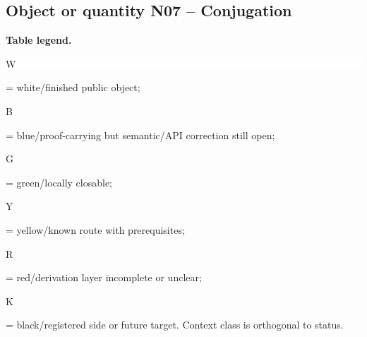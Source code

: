 \subsection*{Object or quantity N07 -- Conjugation}
\hypertarget{objproof:N07}{}
\par\smallskip\noindent\begin{minipage}{0.99\linewidth}\footnotesize\raggedright\textbf{Table legend.} \colorbox{white}{\strut W} = white/finished public object; \colorbox{cyan!20}{\strut B} = blue/proof-carrying but semantic/API correction still open; \colorbox{green!18}{\strut G} = green/locally closable; \colorbox{yellow!25}{\strut Y} = yellow/known route with prerequisites; \colorbox{red!20}{\strut R} = red/derivation layer incomplete or unclear; \colorbox{black!18}{\strut K} = black/registered side or future target. Context class is orthogonal to status.\end{minipage}\par\vspace{0.25em}
